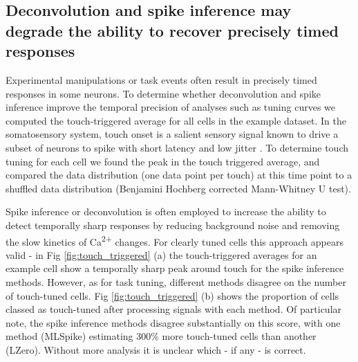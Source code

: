 \documentclass[a4paper,10pt,twocolumn]{article}
\begin{document}
\subsection{Deconvolution and spike inference may degrade the ability to recover precisely timed responses}


Experimental manipulations or task events often result in precisely timed responses in some neurons. To determine whether deconvolution and spike inference improve the temporal precision of analyses such as tuning curves we computed the touch-triggered average for all cells in the example dataset. In the somatosensory system, touch onset is a salient sensory signal known to drive a subset of neurons to spike with short latency and low jitter \citep{OConnor2010-hd, Hires2015-by}. To determine touch tuning for each cell we found the peak in the touch triggered average, and compared the data distribution (one data point per touch) at this time point to a shuffled data distribution (Benjamini Hochberg corrected Mann-Whitney U test). 

Spike inference or deconvolution is often employed to increase the ability to detect temporally sharp responses by reducing background noise and removing the slow kinetics of Ca\textsuperscript{2+} changes. For clearly tuned cells this approach appears valid - in Fig \ref{fig:touch_triggered} (a) the touch-triggered averages for an example cell show a temporally sharp peak around touch for the spike inference methods. However, as for task tuning, different methods disagree on the number of touch-tuned cells. Fig \ref{fig:touch_triggered} (b) shows the proportion of cells classed as touch-tuned after processing signals with each method. Of particular note, the spike inference methods disagree substantially on this score, with one method (MLSpike) estimating 300\% more touch-tuned cells than another (LZero). Without more analysis it is unclear which - if any - is correct.
\end{document}
